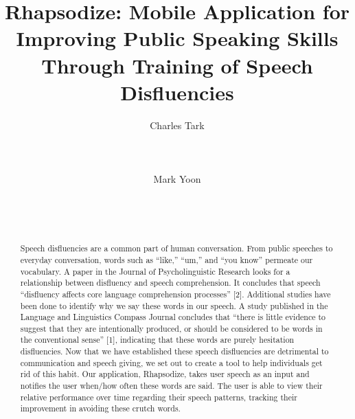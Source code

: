 \documentclass{sigchi}
\begin{document}
\title{Rhapsodize: Mobile Application for Improving Public Speaking Skills Through Training of Speech Disfluencies}

\author{
  \alignauthor Charles Tark\\
    \\
    \\
    \\
  \alignauthor Mark Yoon\\
    \\
    \\
    \\
}

\maketitle

\begin{abstract}
Speech disfluencies are a common part of human conversation. From public speeches to everyday conversation, words such as “like,” “um,” and “you know” permeate our vocabulary. A paper in the Journal of Psycholinguistic Research looks for a relationship between disfluency and speech comprehension. It concludes that speech “disfluency affects core language comprehension processes” [2]. Additional studies have been done to identify why we say these words in our speech. A study published in the Language and Linguistics Compass Journal concludes that “there is little evidence to suggest that they are intentionally produced, or should be considered to be words in the conventional sense” [1], indicating that these words are purely hesitation disfluencies. Now that we have established these speech disfluencies are detrimental to communication and speech giving, we set out to create a tool to help individuals get rid of this habit. Our application, Rhapsodize, takes user speech as an input and notifies the user when/how often these words are said. The user is able to view their relative performance over time regarding their speech patterns, tracking their improvement in avoiding these crutch words.
\end{abstract}


\end{document}
